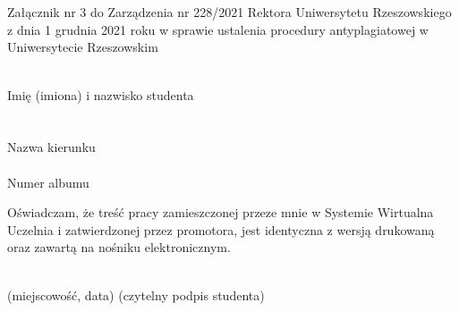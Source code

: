 \chapter*{}
\label{cha:statement-B}
\makeatletter
{}

\noindent
\begin{flushright}
    \begin{minipage}[!h]{10cm}
        Załącznik nr 3 do Zarządzenia nr 228/2021 Rektora Uniwersytetu Rzeszowskiego z dnia 1 grudnia 2021 roku w sprawie ustalenia procedury antyplagiatowej w Uniwersytecie Rzeszowskim
    \end{minipage}
\end{flushright}

\begin{center}
    \vspace*{15mm}
    \vspace*{15mm}
\end{center}


\noindent
\dotuline{\hspace{1.3cm}\@author\hspace{1.3cm}}\\ %
{\small Imię (imiona) i nazwisko studenta }\\

\noindent \@faculty\\

\noindent \dotuline{\hspace{1.4cm}\@degreeprogramme \hspace{1.4cm}}\\
{\small Nazwa kierunku} \\

\noindent \dotuline{\hspace{1.8cm}\@noAlbum\hspace{1.9cm}}\\
{\small Numer albumu}

\vspace*{15mm}
Oświadczam, że treść pracy zamieszczonej przeze mnie w Systemie Wirtualna Uczelnia i zatwierdzonej przez promotora, jest identyczna z wersją drukowaną oraz zawartą na nośniku elektronicznym.

\vspace*{15mm}

\noindent
\underline{\hspace{6cm}} \hfill \underline{\hspace{6cm}} \\ %
\hspace*{13mm}(miejscowość, data)  \hspace*{63mm}(czytelny podpis studenta)